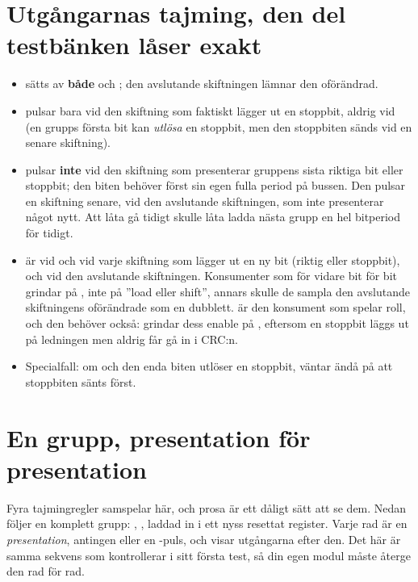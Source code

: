 \section{Utgångarnas tajming, den del testbänken låser exakt}
\label{c14:sec:timing}

\begin{itemize}
  \item {} sätts av \textbf{både}  och ; den avslutande skiftningen
    lämnar den oförändrad.
  \item {} pulsar bara vid den skiftning som faktiskt lägger ut en stoppbit, aldrig vid
     (en grupps första bit kan \emph{utlösa} en stoppbit, men den stoppbiten sänds vid en
    senare skiftning).
  \item {} pulsar \textbf{inte} vid den skiftning som presenterar gruppens sista riktiga bit
    eller stoppbit; den biten behöver först sin egen fulla period på bussen. Den pulsar en skiftning
    senare, vid den avslutande skiftningen, som inte presenterar något nytt. Att låta  gå
    tidigt skulle låta  ladda nästa grupp en hel bitperiod för tidigt.
  \item {} är  vid  och vid varje skiftning som lägger ut en ny
    bit (riktig eller stoppbit), och  vid den avslutande skiftningen. Konsumenter som för
     vidare bit för bit grindar på , inte på ”load eller shift”, annars
    skulle de sampla den avslutande skiftningens oförändrade  som en dubblett.
     är den konsument som spelar roll, och den behöver  också:
     grindar dess enable på , eftersom en stoppbit
    läggs ut på ledningen men aldrig får gå in i CRC:n.
  \item Specialfall: om  och den enda biten utlöser en stoppbit, väntar
     ändå på att stoppbiten sänts först.
\end{itemize}

\section{En grupp, presentation för presentation}
\label{c14:sec:trace}

Fyra tajmingregler samspelar här, och prosa är ett dåligt sätt att se dem. Nedan följer en komplett
grupp: , , laddad in i ett nyss resettat register. Varje
rad är en \emph{presentation}, antingen  eller en -puls, och visar utgångarna
efter den. Det här är samma sekvens som  kontrollerar i sitt första test, så
din egen modul måste återge den rad för rad.

